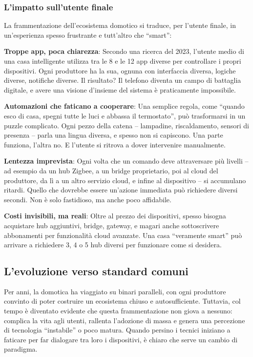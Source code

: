\subsubsection{L'impatto sull'utente finale}

La frammentazione dell’ecosistema domotico si traduce, per l’utente finale, in un’esperienza spesso frustrante e tutt’altro che “smart”:

\textbf{Troppe app, poca chiarezza}: Secondo una ricerca del 2023, l’utente medio di una casa intelligente utilizza tra le 8 e le 12 app diverse per controllare i propri dispositivi. Ogni produttore ha la sua, ognuna con interfaccia diversa, logiche diverse, notifiche diverse. Il risultato? Il telefono diventa un campo di battaglia digitale, e avere una visione d’insieme del sistema è praticamente impossibile.

\textbf{Automazioni che faticano a cooperare}: Una semplice regola, come “quando esco di casa, spegni tutte le luci e abbassa il termostato”, può trasformarsi in un puzzle complicato. Ogni pezzo della catena – lampadine, riscaldamento, sensori di presenza – parla una lingua diversa, e spesso non si capiscono. Una parte funziona, l’altra no. E l’utente si ritrova a dover intervenire manualmente.

\textbf{Lentezza imprevista}: Ogni volta che un comando deve attraversare più livelli – ad esempio da un hub Zigbee, a un bridge proprietario, poi al cloud del produttore, da lì a un altro servizio cloud, e infine al dispositivo – si accumulano ritardi. Quello che dovrebbe essere un’azione immediata può richiedere diversi secondi. Non è solo fastidioso, ma anche poco affidabile.

\textbf{Costi invisibili, ma reali}: Oltre al prezzo dei dispositivi, spesso bisogna acquistare hub aggiuntivi, bridge, gateway, e magari anche sottoscrivere abbonamenti per funzionalità cloud avanzate. Una casa “veramente smart” può arrivare a richiedere 3, 4 o 5 hub diversi per funzionare come si desidera.

\subsection{L'evoluzione verso standard comuni}

Per anni, la domotica ha viaggiato su binari paralleli, con ogni produttore convinto di poter costruire un ecosistema chiuso e autosufficiente. Tuttavia, col tempo è diventato evidente che questa frammentazione non giova a nessuno: complica la vita agli utenti, rallenta l’adozione di massa e genera una percezione di tecnologia “instabile” o poco matura. Quando persino i tecnici iniziano a faticare per far dialogare tra loro i dispositivi, è chiaro che serve un cambio di paradigma.

